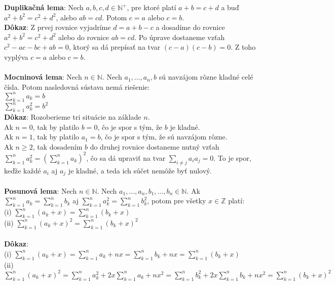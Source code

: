 \documentclass[12pt]{article}
\begin{document}
\textbf{Duplikačná lema}: Nech $a,b,c,d \in \mathbb{N^+}$, pre ktoré platí $a + b = c + d$ a buď $a^2 + b^2 = c^2 + d^2$, alebo $ab = cd$. Potom $c = a$ alebo $c = b$. \\
 
\textbf{Dôkaz}: Z prvej rovnice vyjadríme $d = a + b - c$ a dosadíme do rovnice $a^2 + b^2 = c^2 + d^2$ alebo do rovnice $ab = cd$. Po úprave dostaneme vzťah $c^2 - ac - bc + ab = 0$, ktorý sa dá prepísať na tvar $(c - a)(c - b) = 0$. Z toho vyplýva $c = a$ alebo $c = b$. \\\\

\textbf{Mocninová lema}: Nech $n \in \mathbb{N}$. Nech $a_1, ... , a_n , b$ sú navzájom rôzne kladné celé čísla. Potom nasledovná sústava nemá riešenie: \\
$\sum_{k=1}^{n} a_k = b$ \\
$\sum_{k=1}^{n} a^2_k = b^2$ \\

\textbf{Dôkaz}: Rozoberieme tri situácie na základe $n$. \\

Ak $n = 0$, tak by platilo $b = 0$, čo je spor s tým, že $b$ je kladné. \\

Ak $n = 1$, tak by platilo $a_1 = b$, čo je spor s tým, že sú navzájom rôzne. \\

Ak $n \geq 2$, tak dosadením $b$ do druhej rovnice dostaneme nutný vzťah $\sum_{k=1}^{n} a^2_k = (\sum_{k=1}^{n} a_k)^2$, čo sa dá upraviť na tvar $\sum_{i \neq j} a_i a_j = 0$. To je spor, keďže každé $a_i$ aj $a_j$ je kladné, a teda ich súčet nemôže byť nulový. \\\\

\textbf{Posunová lema}: Nech $n \in \mathbb{N}$. Nech $a_1, ... , a_n, b_1, ... , b_n \in \mathbb{N}$. Ak $\sum_{k=1}^{n} a_k = \sum_{k=1}^{n} b_k$ aj $\sum_{k=1}^{n} a^2_k = \sum_{k=1}^{n} b^2_k$, potom pre všetky $x \in \mathbb{Z}$ platí: \\
(i) $\sum_{k=1}^{n} (a_k + x) = \sum_{k=1}^{n} (b_k + x)$ \\
(ii) $\sum_{k=1}^{n} (a_k + x)^2 = \sum_{k=1}^{n} (b_k + x)^2$ \\\\
 
\textbf{Dôkaz}: \\
(i) $\sum_{k=1}^{n} (a_k + x) = \sum_{k=1}^{n} a_k + nx = \sum_{k=1}^{n} b_k + nx = \sum_{k=1}^{n} (b_k + x)$ \\
(ii) $\sum_{k=1}^{n} (a_k + x)^2 = \sum_{k=1}^{n} a^2_k + 2x \sum_{k=1}^{n} a_k + nx^2 = \sum_{k=1}^{n} b^2_k + 2x \sum_{k=1}^{n} b_k + nx^2 = \sum_{k=1}^{n} (b_k + x)^2$ \\\\\\
\end{document}
